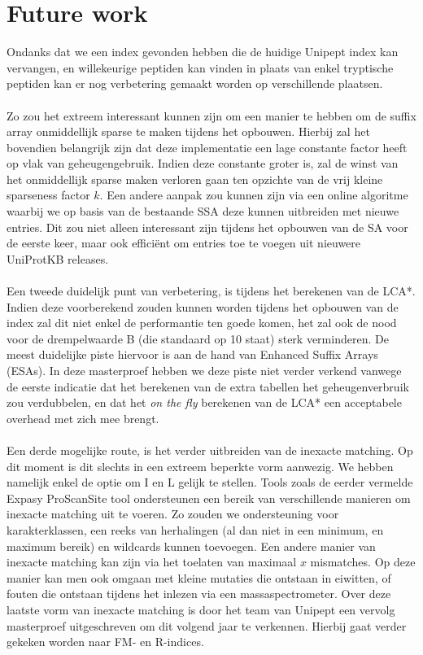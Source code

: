 \section{Future work}
Ondanks dat we een index gevonden hebben die de huidige Unipept index kan vervangen, en willekeurige peptiden kan vinden in plaats van enkel tryptische peptiden kan er nog verbetering gemaakt worden op verschillende plaatsen.
\\ \\
Zo zou het extreem interessant kunnen zijn om een manier te hebben om de suffix array onmiddellijk sparse te maken tijdens het opbouwen.
Hierbij zal het bovendien belangrijk zijn dat deze implementatie een lage constante factor heeft op vlak van geheugengebruik.
Indien deze constante groter is, zal de winst van het onmiddellijk sparse maken verloren gaan ten opzichte van de vrij kleine sparseness factor $k$.
Een andere aanpak zou kunnen zijn via een online algoritme waarbij we op basis van de bestaande SSA deze kunnen uitbreiden met nieuwe entries.
Dit zou niet alleen interessant zijn tijdens het opbouwen van de SA voor de eerste keer, maar ook efficiënt om entries toe te voegen uit nieuwere UniProtKB releases.
\\ \\
Een tweede duidelijk punt van verbetering, is tijdens het berekenen van de LCA*.
Indien deze voorberekend zouden kunnen worden tijdens het opbouwen van de index zal dit niet enkel de performantie ten goede komen, het zal ook de nood voor de drempelwaarde B (die standaard op 10 staat) sterk verminderen.
De meest duidelijke piste hiervoor is aan de hand van Enhanced Suffix Arrays (ESAs).
In deze masterproef hebben we deze piste niet verder verkend vanwege de eerste indicatie dat het berekenen van de extra tabellen het geheugenverbruik zou verdubbelen, en dat het \textit{on the fly} berekenen van de LCA* een acceptabele overhead met zich mee brengt.
\\ \\
Een derde mogelijke route, is het verder uitbreiden van de inexacte matching.
Op dit moment is dit slechts in een extreem beperkte vorm aanwezig.
We hebben namelijk enkel de optie om I en L gelijk te stellen.
Tools zoals de eerder vermelde Expasy ProScanSite tool ondersteunen een bereik van verschillende manieren om inexacte matching uit te voeren.
Zo zouden we ondersteuning voor karakterklassen, een reeks van herhalingen (al dan niet in een minimum, en maximum bereik) en wildcards kunnen toevoegen.
Een andere manier van inexacte matching kan zijn via het toelaten van maximaal $x$ mismatches.
Op deze manier kan men ook omgaan met kleine mutaties die ontstaan in eiwitten, of fouten die ontstaan tijdens het inlezen via een massaspectrometer.
Over deze laatste vorm van inexacte matching is door het team van Unipept een vervolg masterproef uitgeschreven om dit volgend jaar te verkennen.
Hierbij gaat verder gekeken worden naar FM- en R-indices.